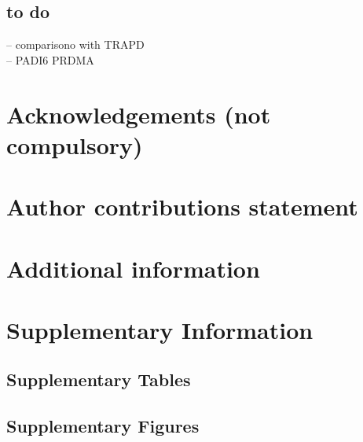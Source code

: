 \documentclass[fleqn,10pt]{wlscirep}
\newcommand{\beginsupplement}{%
        \setcounter{table}{0}
        \renewcommand{\thetable}{S\arabic{table}}%
        \setcounter{figure}{0}
        \renewcommand{\thefigure}{S\arabic{figure}}%
     }
\begin{document}
\subsection*{to do}
-- comparisono with TRAPD\\ 
-- PADI6 PRDMA\\





\section*{Acknowledgements (not compulsory)}
\section*{Author contributions statement}
\section*{Additional information}

\FloatBarrier


\FloatBarrier


\beginsupplement
\section*{Supplementary Information}
\subsection*{Supplementary Tables}

\subsection*{Supplementary Figures}

\end{document}
